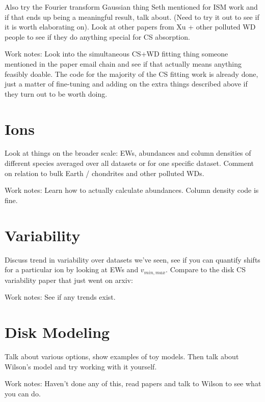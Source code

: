 Also try the Fourier transform Gaussian thing Seth mentioned for ISM work and if that ends up being a meaningful result, talk about. (Need to try it out to see if it is worth elaborating on). Look at other papers from Xu + other polluted WD people to see if they do anything special for CS absorption.

Work notes: Look into the simultaneous CS+WD fitting thing someone mentioned in the paper email chain and see if that actually means anything feasibly doable. The code for the majority of the CS fitting work is already done, just a matter of fine-tuning and adding on the extra things described above if they turn out to be worth doing.



\section{Ions}
\label{spectra_ions}
Look at things on the broader scale: EWs, abundances and column densities of different species averaged over all datasets or for one specific dataset. Comment on relation to bulk Earth / chondrites and other polluted WDs.

Work notes: Learn how to actually calculate abundances. Column density code is fine.

\section{Variability}
\label{spectra_variability}
Discuss trend in variability over datasets we've seen, see if you can quantify shifts for a particular ion by looking at EWs and $v_{min,max}$. Compare to the disk CS variability paper that just went on arxiv: \cite{Manser2016}

Work notes: See if any trends exist. 

\section{Disk Modeling}
\label{spectra_modeling}
Talk about various options, show examples of toy models. Then talk about Wilson's model and try working with it yourself. 

Work notes: Haven't done any of this, read papers and talk to Wilson to see what you can do.


